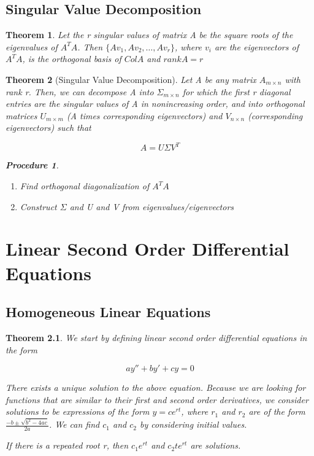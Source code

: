 \documentclass[12pt]{report}
\newtheorem{thm}{Theorem}
\newtheorem{proc}{Procedure}
\newcommand{\mtx}[3]{$#1_{#2\times #3}$}
\begin{document}
\section{Singular Value Decomposition}

\begin{thm}
Let the r singular values of matrix A be the square roots of the eigenvalues of $A^TA$. Then $\{Av_1, Av_2, \ldots, Av_r\}$, where $v_i$ are the eigenvectors of $A^TA$, is the orthogonal basis of $Col A$ and $rank A = r$
\end{thm}

\begin{thm}[Singular Value Decomposition]
Let A be any matrix \mtx{A}{m}{n} with rank r. Then, we can decompose A into \mtx{\Sigma}{m}{n} for which the first r diagonal entries are the singular values of A in nonincreasing order, and into orthogonal matrices \mtx{U}{m}{m} (A times corresponding eigenvectors) and \mtx{V}{n}{n} (corresponding eigenvectors) such that

\begin{equation}
A=U\Sigma V^T
\end{equation}

\begin{proc}
\begin{enumerate}
\item Find orthogonal diagonalization of $A^TA$
\item Construct $\Sigma$ and U and V from eigenvalues/eigenvectors
\end{enumerate}
\end{proc}

\end{thm}

\chapter{Linear Second Order Differential Equations}

\section{Homogeneous Linear Equations}

\begin{thm}
We start by defining linear second order differential equations in the form 

\begin{equation}
ay''+by'+cy=0
\end{equation}

There exists a unique solution to the above equation. Because we are looking for functions that are similar to their first and second order derivatives, we consider solutions to be expressions of the form $y=ce^{rt}$, where $r_1$ and $r_2$ are of the form $\frac{-b \pm \sqrt{b^2-4ac}}{2a}$. We can find $c_1$ and $c_2$ by considering initial values.

If there is a repeated root r, then $c_1e^{rt}$ and $c_2te^{rt}$ are solutions.

\end{thm}
\end{document}
